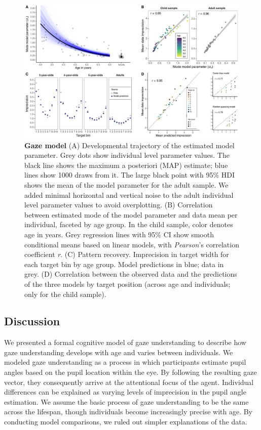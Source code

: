 \documentclass[
  man,mask,floatsintext]{apa7}
\begin{document}
\begin{figure}

{\centering \includegraphics[width=1\linewidth]{../figures/gazemodel_plot} 

}

\caption{\textbf{Gaze model} (A) Developmental trajectory of the estimated model parameter. Grey dots show individual level parameter values. The black line shows the maximum a posteriori (MAP) estimate; blue lines show 1000 draws from it. The large black point with 95\% HDI shows the mean of the model parameter for the adult sample. We added minimal horizontal and vertical noise to the adult individual level parameter values to avoid overplotting. (B) Correlation between estimated mode of the model parameter and data mean per individual, faceted by age group. In the child sample, color denotes age in years. Grey regression lines with 95\% CI show smooth conditional means based on linear models, with \emph{Pearson}'s correlation coefficient \emph{r}. (C) Pattern recovery. Imprecision in target width for each target bin by age group. Model predictions in blue; data in grey. (D) Correlation between the observed data and the predictions of the three models by target position (across age and individuals; only for the child sample).}\label{fig:fig3}
\end{figure}

\hypertarget{discussion-1}{%
\subsection{Discussion}\label{discussion-1}}

We presented a formal cognitive model of gaze understanding to describe how gaze understanding develops with age and varies between individuals. We modeled gaze understanding as a process in which participants estimate pupil angles based on the pupil location within the eye. By following the resulting gaze vector, they consequently arrive at the attentional focus of the agent. Individual differences can be explained as varying levels of imprecision in the pupil angle estimation. We assume the basic process of gaze understanding to be the same across the lifespan, though individuals become increasingly precise with age. By conducting model comparisons, we ruled out simpler explanations of the data.
\end{document}
